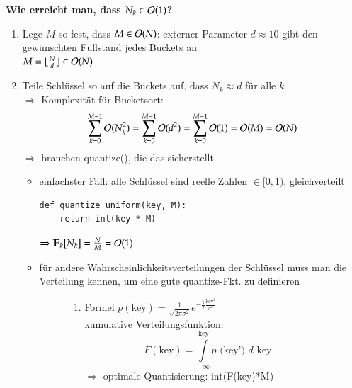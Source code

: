 \textbf{Wie erreicht man, dass $N_k \in \mathcal{O}{}(1)$?}
\begin {enumerate}
    \item Lege $M$ so fest, dass $M \in \mathcal{O}{}(N)$: externer Parameter $d \approx 10$ gibt den gewünschten Füllstand jedes Buckets an \\
    \hspace*{3cm} $M = \lfloor \frac{N}{d} \rfloor \in \mathcal{O}{}(N)$

    \item Teile Schlüssel so auf die Buckets auf, dass $N_k \approx d$ für alle $k$ \\
    $\Rightarrow$ Komplexität für Bucketsort:
    \[ \sum_{k=0}^{M-1} \mathcal{O}{}(N_k^2) = \sum_{k=0}^{M-1} \mathcal{O}{}(d^2) = \sum_{k=0}^{M-1} \mathcal{O}{}(1) = \mathcal{O}{}(M) = \mathcal{O}{}(N)\]
    $\Rightarrow$ brauchen quantize(), die das sicherstellt
    \begin{itemize}
        \item einfachster Fall: alle Schlüssel sind reelle Zahlen $\in [0, 1)$, gleichverteilt
        \begin{verbatim}
def quantize_uniform(key, M):
    return int(key * M)
        \end{verbatim}
        $\Rightarrow \mathbb{E}_k[N_k] = \frac{N}{M} = \mathcal{O}{}(1)$

        \item für andere Wahrscheinlichkeitsverteilungen der Schlüssel muss man die Verteilung kennen, um eine gute quantize-Fkt. zu definieren

        \begin{figure}[htbp]
            \begin{minipage}[t]{10cm}
                \centering
                \begin{enumerate}[label={\alph*)}]
                    \item Formel $p(\text{key}) = \frac{1}{\sqrt{2\pi \sigma^2}} e^{-\frac{1}{2} \frac{\text{key}^2}{\sigma^2}}$  \\
                    \vspace*{5mm}
                    kumulative Verteilungsfunktion:
                    \[ F(\text{key}) = \int\limits_{-\infty}^{\text{key}} p\text{ (key') } d \text{ key } \]
                    \vspace*{5mm}
                    $\Rightarrow$ optimale Quantisierung: int(F(key)*M)


\end{enumerate}
\end{minipage}
\end{figure}
\end{itemize}
\end{enumerate}
